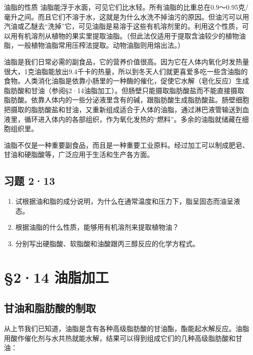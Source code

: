油脂的性质
油脂能浮于水面，可见它们比水轻。所有油脂的比重总在0.9～0.95克/毫升之间。而且它们不溶于水，这就是为什么水洗不掉油污的原因。但油污可以用汽油或乙醚去``洗掉''它，可见油脂是易溶于这些有机溶剂里的。利用这个性质，可以用有机溶剂从植物的果实里提取油脂。（但此法仅适用于提取含油较少的植物油脂，一般植物油脂常用压榨法提取。动物油脂则用熔出法。）

油脂是我们日常必需的副食品，它的营养价值很高。因为它在人体内氧化时发热量很大，1克油脂能放出9.4千卡的热量，所以到冬天人们就更喜爱多吃一些含油脂的食物。人类消化油脂是依靠小肠里的一种酶的催化，促使它水解（皂化反应）生成脂肪酸和甘油（参阅§2·14油脂加工）。但肠壁只能摄取脂肪酸盐而不能直接摄取脂肪酸。依靠人体内的一些分泌液里含有的碱，跟脂肪酸生成脂肪酸盐。肠壁细胞把摄取的脂肪酸盐和甘油，又重新组成适合于人体的油脂，通过淋巴液管输送到血液里，循环进入体内的各部组织，作为氧化发热的``燃料''。多余的油脂就储藏在细胞组织里。

油脂不仅是一种重要副食品，而且是一种重要工业原料。经过加工可以制成肥皂、甘油和硬脂酸等，广泛应用于生活和生产各方面。

\subsection{习题 2·13}

\begin{enumerate}
\item
  试根据油和脂的成分说明，为什么在通常温度和压力下，脂呈固态而油呈液态。
\item
  根据油脂的什么性质，能够用有机溶剂来提取植物油？
\item
  分别写出硬脂酸、软脂酸和油酸跟丙三醇反应的化学方程式。
\end{enumerate}

\section{§2·14 油脂加工}

\subsection{甘油和脂肪酸的制取}

从上节我们已知道，油脂是含有各种高级脂肪酸的甘油酯，酯能起水解反应。油脂用酸作催化剂与水共热就能水解，结果可以得到组成它们的几种高级脂肪酸和甘油：

